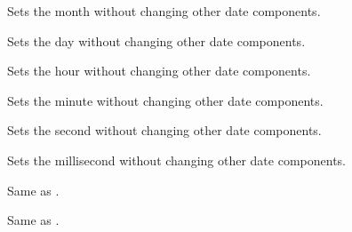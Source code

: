 
Sets the month without changing other date components.

\label{wxdatetimesetday}


Sets the day without changing other date components.

\label{wxdatetimesethour}


Sets the hour without changing other date components.

\label{wxdatetimesetminute}


Sets the minute without changing other date components.

\label{wxdatetimesetsecond}


Sets the second without changing other date components.

\label{wxdatetimesetmillisecond}


Sets the millisecond without changing other date components.

\label{wxdatetimeoperatoreqtimet}


Same as .

\label{wxdatetimeoperatoreqtm}


Same as .


\label{wxdatetimeisvalid}



